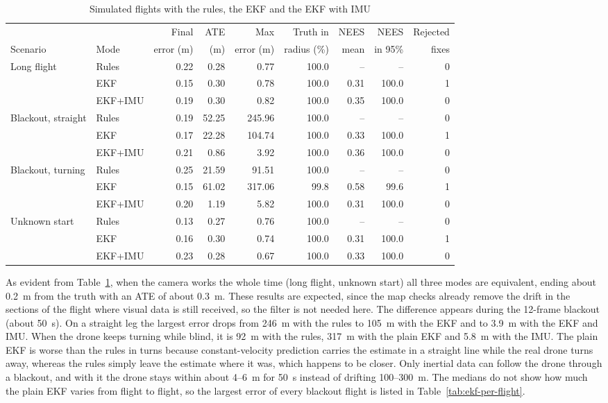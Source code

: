 \documentclass[english, Lau, oneside]{sapthesis}%
\begin{document}
\begin{table}[!htbp]
  \centering
  \caption{Simulated flights with the rules, the EKF and the EKF with IMU}
  \label{tab:ekf-sim}
  \footnotesize\setlength{\tabcolsep}{2.5pt}
  \begin{tabular}{llrrrrrrr}
    \toprule
    & & Final & ATE & Max & Truth in & NEES & NEES & Rejected \\
    Scenario & Mode & error (m) & (m) & error (m) & radius (\%) & mean & in 95\% & fixes \\
    \midrule
    Long flight & Rules & 0.22 & 0.28 & 0.77 & 100.0 & -- & -- & 0 \\
     & EKF & 0.15 & 0.30 & 0.78 & 100.0 & 0.31 & 100.0 & 1 \\
     & EKF+IMU & 0.19 & 0.30 & 0.82 & 100.0 & 0.35 & 100.0 & 0 \\
    \addlinespace
    Blackout, straight & Rules & 0.19 & 52.25 & 245.96 & 100.0 & -- & -- & 0 \\
     & EKF & 0.17 & 22.28 & 104.74 & 100.0 & 0.33 & 100.0 & 1 \\
     & EKF+IMU & 0.21 & 0.86 & 3.92 & 100.0 & 0.36 & 100.0 & 0 \\
    \addlinespace
    Blackout, turning & Rules & 0.25 & 21.59 & 91.51 & 100.0 & -- & -- & 0 \\
     & EKF & 0.15 & 61.02 & 317.06 & 99.8 & 0.58 & 99.6 & 1 \\
     & EKF+IMU & 0.20 & 1.19 & 5.82 & 100.0 & 0.31 & 100.0 & 0 \\
    \addlinespace
    Unknown start & Rules & 0.13 & 0.27 & 0.76 & 100.0 & -- & -- & 0 \\
     & EKF & 0.16 & 0.30 & 0.74 & 100.0 & 0.31 & 100.0 & 1 \\
     & EKF+IMU & 0.23 & 0.28 & 0.67 & 100.0 & 0.33 & 100.0 & 0 \\
    \bottomrule
  \end{tabular}
\end{table}

As evident from Table~\ref{tab:ekf-sim}, when the camera works the whole time (long flight, unknown start) all three modes are equivalent, ending about 0.2~m from the truth with an ATE of about 0.3~m. These results are expected, since the map checks already remove the drift in the sections of the flight where visual data is still received, so the filter is not needed here. The difference appears during the 12-frame blackout (about 50~s). On a straight leg the largest error drops from 246~m with the rules to 105~m with the EKF and to 3.9~m with the EKF and IMU. When the drone keeps turning while blind, it is 92~m with the rules, 317~m with the plain EKF and 5.8~m with the IMU. The plain EKF is worse than the rules in turns because constant-velocity prediction carries the estimate in a straight line while the real drone turns away, whereas the rules simply leave the estimate where it was, which happens to be closer. Only inertial data can follow the drone through a blackout, and with it the drone stays within about 4--6~m for 50~s instead of drifting 100--300~m. The medians do not show how much the plain EKF varies from flight to flight, so the largest error of every blackout flight is listed in Table~\ref{tab:ekf-per-flight}.
\end{document}

